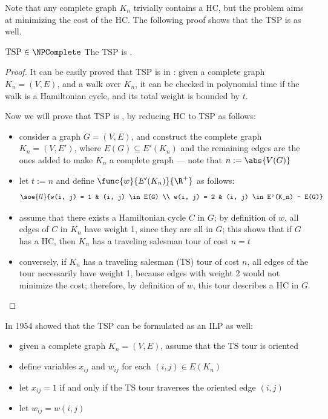 \documentclass[a4paper, 12pt]{report}
\begin{document}
    Note that any complete graph $K_n$ trivially contains a HC, but the problem aims at minimizing the cost of the HC. The following proof shows that the TSP is \NPComplete as well.

    \begin{framedthm}[label={tsp np compl}]{$\mathrm{TSP} \in \NPComplete$}
        The TSP is \NPComplete.
    \end{framedthm}

    \begin{proof}
        It can be easily proved that TSP is in \NPclass: given a complete graph $K_n =(V, E)$, and a walk over $K_n$, it can be checked in polynomial time if the walk is a Hamiltonian cycle, and its total weight is bounded by $t$.

        Now we will prove that TSP is \NPHard, by reducing HC to TSP as follows:

        \begin{itemize}
            \item consider a graph $G = (V, E)$, and construct the complete graph $K_n = (V, E')$, where $E(G) \subseteq E'(K_n)$ and the remaining edges are the ones added to make $K_n$ a complete graph --- note that $n := \abs{V(G)}$
            \item let $t := n$ and define $\func{w}{E'(K_n)}{\R^+}$ as follows: $$\soe{ll}{w(i, j) = 1 & (i, j) \in E(G) \\ w(i, j) = 2 & (i, j) \in E'(K_n) - E(G)}$$
            \item assume that there exists a Hamiltonian cycle $C$ in $G$; by definition of $w$, all edges of $C$ in $K_n$ have weight 1, since they are all in $G$; this shows that if $G$ has a HC, then $K_n$ has a traveling salesman tour of cost $n = t$
            \item conversely, if $K_n$ has a traveling salesman (TS) tour of cost $n$, all edges of the tour necessarily have weight 1, because edges with weight 2 would not minimize the cost; therefore, by definition of $w$, this tour describes a HC in $G$
            \end{itemize}
    \end{proof}

    In 1954 \textcite{dantzig} showed that the TSP can be formulated as an ILP as well:

    \begin{itemize}
        \item given a complete graph $K_n = (V, E)$, assume that the TS tour is oriented
        \item define variables $x_{ij}$ and $w_{ij}$ for each $(i, j) \in E(K_n)$
        \item let $x_{ij} = 1$ if and only if the TS tour traverses the oriented edge $(i, j)$
        \item let $w_{ij} = w(i, j)$
    \end{itemize}
\end{document}
